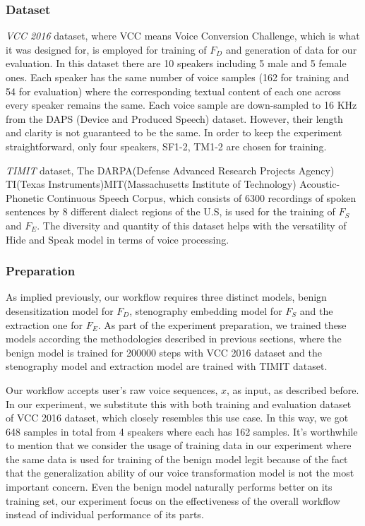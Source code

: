 \documentclass[journal]{IEEEtran} %
\begin{document}
\subsubsection{Dataset}

\textit{VCC 2016} dataset, where VCC means Voice Conversion Challenge, which is what it was designed for, is employed for training of $F_D$ and generation of data for our evaluation. In this dataset there are 10 speakers including 5 male and 5 female ones. Each speaker has the same number of voice samples (162 for training and 54 for evaluation) where the corresponding textual content of each one across every speaker remains the same. Each voice sample are down-sampled to 16 KHz from the DAPS (Device and Produced Speech) dataset. However, their length and clarity is not guaranteed to be the same. In order to keep the experiment straightforward, only four speakers, SF1-2, TM1-2 are chosen for training.

\textit{TIMIT} dataset, The DARPA(Defense Advanced Research Projects Agency) TI(Texas Instruments)MIT(Massachusetts Institute of Technology) Acoustic-Phonetic Continuous Speech Corpus, which consists of 6300 recordings of spoken sentences by 8 different dialect regions of the U.S, is used for the training of $F_S$ and $F_E$. The diversity and quantity of this dataset helps with the versatility of Hide and Speak model in terms of voice processing.

\subsubsection{Preparation}

As implied previously, our workflow requires three distinct models, benign desensitization model for $F_D$, stenography embedding model for $F_S$ and the extraction one for $F_E$. As part of the experiment preparation, we trained these models according the methodologies described in previous sections, where the benign model is trained for 200000 steps with VCC 2016 dataset and the stenography model and extraction model are trained with TIMIT dataset.

Our workflow accepts user's raw voice sequences, $x$, as input, as described before. In our experiment, we substitute this with both training and evaluation dataset of VCC 2016 dataset, which closely resembles this use case. In this way, we got 648 samples in total from 4 speakers where each has 162 samples. It's worthwhile to mention that we consider the usage of training data in our experiment where the same data is used for training of the benign model legit because of the fact that the generalization ability of our voice transformation model is not the most important concern. Even the benign model naturally performs better on its training set, our experiment focus on the effectiveness of the overall workflow instead of individual performance of its parts.
\end{document}
